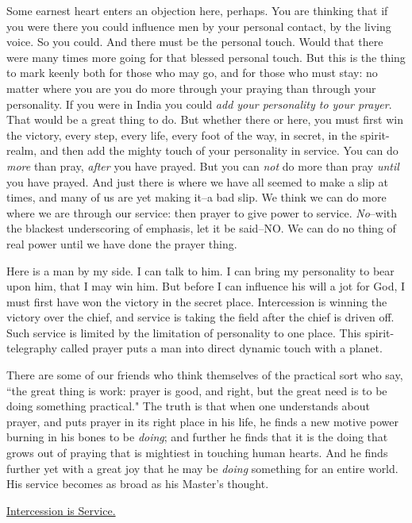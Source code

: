 Some earnest heart enters an objection here, perhaps. You are thinking
that if you were there you could influence men by your personal contact,
by the living voice. So you could. And there must be the personal touch.
Would that there were many times more going for that blessed personal
touch. But this is the thing to mark keenly both for those who may go, and
for those who must stay: no matter where you are you do more through your
praying than through your personality. If you were in India you could \textit{add
your personality to your prayer}. That would be a great thing to do. But
whether there or here, you must first win the victory, every step, every
life, every foot of the way, in secret, in the spirit-realm, and then add
the mighty touch of your personality in service. You can do \textit{more} than
pray, \textit{after} you have prayed. But you can \textit{not} do more than pray \textit{until}
you have prayed. And just there is where we have all seemed to make a
slip at times, and many of us are yet making it--a bad slip. We think we
can do more where we are through our service: then prayer to give power to
service. \textit{No}--with the blackest underscoring of emphasis, let it be
said--NO. We can do no thing of real power until we have done the prayer
thing.

Here is a man by my side. I can talk to him. I can bring my personality to
bear upon him, that I may win him. But before I can influence his will a
jot for God, I must first have won the victory in the secret place.
Intercession is winning the victory over the chief, and service is taking
the field after the chief is driven off. Such service is limited by the
limitation of personality to one place. This spirit-telegraphy called
prayer puts a man into direct dynamic touch with a planet.

There are some of our friends who think themselves of the practical sort
who say, ``the great thing is work: prayer is good, and right, but the
great need is to be doing something practical." The truth is that when one
understands about prayer, and puts prayer in its right place in his life,
he finds a new motive power burning in his bones to be \textit{doing}; and
further he finds that it is the doing that grows out of praying that is
mightiest in touching human hearts. And he finds further yet with a great
joy that he may be \textit{doing} something for an entire world. His service
becomes as broad as his Master's thought.



\underline{Intercession is Service.}


